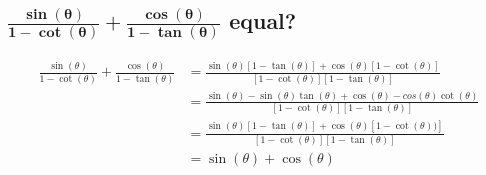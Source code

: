 \documentclass{article}
\begin{document}
\subsection{$\mathbf{\frac{\sin(\theta)}{1-\cot(\theta)} + \frac{\cos(\theta)}{1-\tan(\theta)}}$ equal?}
\begin{align*}
    \frac{\sin(\theta)}{1-\cot(\theta)} + \frac{\cos(\theta)}{1-\tan(\theta)} 
    &= \frac{\sin(\theta)[1-\tan(\theta)] + \cos(\theta)[1-\cot(\theta)]}{[1-\cot(\theta)][1-\tan(\theta)]} \\
    &= \frac{\sin(\theta)-\sin(\theta)\tan(\theta)+\cos(\theta)-cos(\theta)\cot(\theta)}{[1-\cot(\theta)][1-\tan(\theta)]} \\
    &= \frac{\sin(\theta)[1-\tan(\theta)] + \cos(\theta)[1-\cot(\theta))]}{[1-\cot(\theta)][1-\tan(\theta)]} \\
    &= \sin(\theta) + \cos(\theta)
\end{align*}
\end{document}
